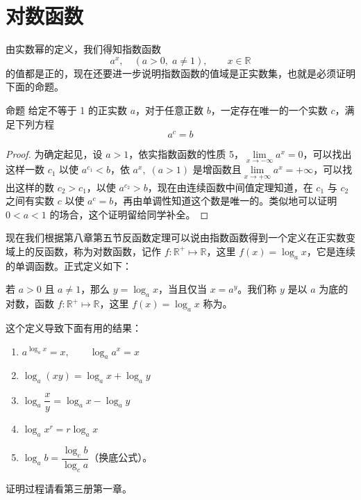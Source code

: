 \section{对数函数}

由实数幂的定义，我们得知指数函数
\[a^x,\quad (a>0,\;a\ne 1),\qquad x\in\mathbb{R}\]
的值都是正的，现在还要进一步说明指数函数的值域是正实数集，也就是必须证明下面的命题。

\begin{Theorem}{命题}
给定不等于 1 的正实数 $a$，对于任意正数 $b$，一定存在唯一的一个实数 $c$，满足下列方程
\[a^c=b\]
\end{Theorem}

\begin{proof}
为确定起见，设 $a>1$，依实指数函数的性质 5，$\lim\limits_{x\to-\infty}a^x=0$，可以找出这样一数 $c_1$ 以使 $a^{c_1}<b$，依 $a^x,\;(a>1)$ 是增函数且$\lim\limits_{x\to+\infty}a^x=+\infty$，可以找出这样的数 $c_2>c_1$，以使 $a^{c_2}>b$，现在由连续函数中间值定理知道，在 $c_1$ 与 $c_2$ 之间有实数 $c$ 以使 $a^c=b$，再由单调性知道这个数是唯一的。类似地可以证明 $0<a<1$ 的场合，这个证明留给同学补全。
\end{proof}


现在我们根据第八章第五节反函数定理可以说由指数函数得到一个定义在正实数变域上的反函数，称为对数函数，记作 $f:\mathbb{R}^+\mapsto \mathbb{R}$，这里 $f(x)=\log_a x$，它是连续的单调函数。正式定义如下：

\begin{Definition}
若 $a>0$ 且 $a\ne 1$，那么 $y=\log_a x$，当且仅当 $x=a^y$。我们称 $y$ 是以 $a$ 为底的对数，函数 $f:\mathbb{R}^+\mapsto \mathbb{R}$，这里 $f(x)=\log_a x$ 称为。
\end{Definition}

这个定义导致下面有用的结果：
\begin{enumerate}[itemsep=5pt]
  \item $a^{\log_a x}=x,\qquad \log_a a^x=x$
  \item $\log_a (xy)=\log_a x+\log_a y$
  \item $\log_a \dfrac{x}{y}=\log_a x-\log_a y$
  \item $\log_a x^r=r\log_a x$
  \item $\log_a b=\dfrac{\log_c b}{\log_c a}$（换底公式）。
\end{enumerate}
证明过程请看第三册第一章。

